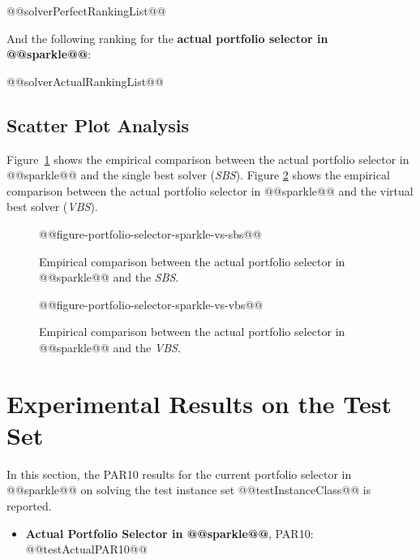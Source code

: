 \documentclass[british]{article}
\begin{document}
\begin{enumerate} 
@@solverPerfectRankingList@@
\end{enumerate}

And the following ranking for the \textbf{actual portfolio selector in @@sparkle@@}:

\begin{enumerate} 
@@solverActualRankingList@@
\end{enumerate}


\subsection{Scatter Plot Analysis}

Figure~\ref{fig:sparkle_vs_sbs} shows the empirical comparison between the actual portfolio selector in @@sparkle@@ and the single best solver (\emph{SBS}).
Figure \ref{fig:sparkle_vs_vbs} shows the empirical comparison between the actual portfolio selector in @@sparkle@@ and the virtual best solver (\emph{VBS}).

\begin{figure}[htbp]
\noindent \begin{centering}
@@figure-portfolio-selector-sparkle-vs-sbs@@
\par\end{centering}

\caption{Empirical comparison between the actual portfolio selector in @@sparkle@@ and the \emph{SBS}.}\label{fig:sparkle_vs_sbs}
\end{figure}

\begin{figure}[htbp]
\noindent \begin{centering}
@@figure-portfolio-selector-sparkle-vs-vbs@@
\par\end{centering}

\caption{Empirical comparison between the actual portfolio selector in @@sparkle@@ and the \emph{VBS}.}\label{fig:sparkle_vs_vbs}
\end{figure}


\section{Experimental Results on the Test Set}
\label{sec:Experimental_Results}

In this section, the PAR10 results for the current portfolio selector in @@sparkle@@ on solving the test instance set @@testInstanceClass@@ is reported.

\begin{itemize}
\item \textbf{Actual Portfolio Selector in @@sparkle@@}, PAR10: @@testActualPAR10@@
\end{itemize}




\end{document}
